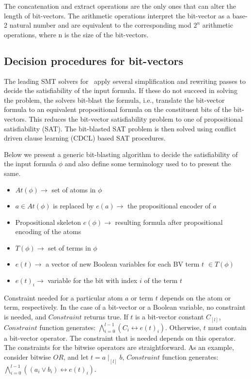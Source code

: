 The
concatenation and extract operations are the only ones that can alter the
length of bit-vectors. The arithmetic operations interpret the bit-vector as a base-2 natural number and are
equivalent to the corresponding mod $2^n$ arithmetic operations, where n is the size of the bit-vectors.

\subsection{Decision procedures for bit-vectors}

The leading SMT solvers for \qfbv~apply several simplification and
rewriting passes to decide the satisfiability of the input formula.
If these do not succeed in solving the problem, the solvers bit-blast
the formula, i.e., translate the bit-vector formula to an
equivalent propositional formula on the constituent bits of the
bit-vectors.  This reduces the bit-vector satisfiability problem to
one of propositional satisfiability (SAT).
%
The bit-blasted SAT problem is then solved using conflict driven clause
learning (CDCL)\cite{cdcl1,cdcl2} based SAT procedures.
%

Below we present a generic bit-blasting algorithm to decide the satisfiability of the input formula $\phi$ and also define some terminology used to to present the same.

\begin{itemize}

\item $At(\phi)\rightarrow$ set of atoms in $\phi$ 
\item $a \in At(\phi)$ is replaced by $e(a) \rightarrow$ the propositional encoder of $a$ 
\item Propositional skeleton $e(\phi) \rightarrow$ resulting formula after propositional encoding of the atoms 
\item $T(\phi)\rightarrow$ set of terms in $\phi$ 
\item $e(t)\rightarrow$ a vector of new Boolean variables for each BV term $t$ $\in T(\phi)$ 
\item $e(t)_i\rightarrow$ variable for the bit with index $i$ of the term $t$ 
\end{itemize}



Constraint needed for a particular atom $a$ or term $t$ depends
on the atom or term, respectively. In the case of a bit-vector or a Boolean
variable, no constraint is needed, and $Constraint$ returns true. If $t$ is
a bit-vector constant $C_{[l]}$, $Constraint$ function generates: $\bigwedge^{l-1}_{i=0}(C_i \leftrightarrow e(t)_i)$. Otherwise, $t$ must contain a bit-vector operator. The constraint that is needed
depends on this operator. The constraints for the bitwise operators are
straightforward. As an example, consider bitwise $OR$, and let $t = a \mid_{[l]} b$, $Constraint$ function generates: $\bigwedge^{l-1}_{i=0}((a_i \lor b_i) \leftrightarrow e(t)_i)$.

